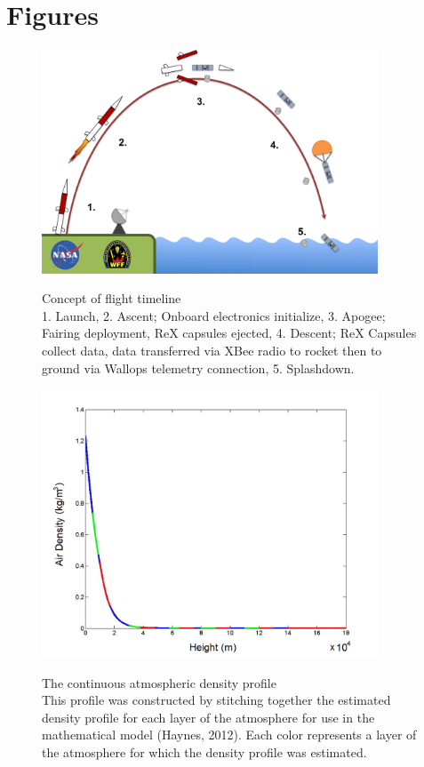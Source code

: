 \documentclass{article}
\begin{document}
\section{Figures}
	\begin{figure}[h]
	\begin{center}
		\includegraphics[width=10cm]{ConceptOfFlight}\\
	\end{center}
		\caption{}
		\label{timeline}
Concept of flight timeline\\1. Launch,  2. Ascent; Onboard electronics initialize,  3. Apogee; Fairing deployment, ReX capsules ejected,  4. Descent; ReX Capsules collect data, data transferred via XBee radio to rocket then to ground via Wallops telemetry connection,  5. Splashdown.
	\end{figure}

	\begin{figure}[H]
	\begin{center}
		\includegraphics[width=10cm]{StitchedAirDensity}\\
	\end{center}
		\caption{}
		\label{stitch} 
The continuous atmospheric density profile\\ This profile was constructed by stitching together the estimated density profile for each layer of the atmosphere for use in the mathematical model (Haynes, 2012). Each color represents a layer of the atmosphere for which the density profile was estimated.
	\end{figure}
	
\end{document}
